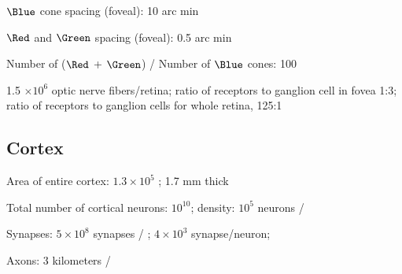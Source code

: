 \item $\Blue$ cone spacing (foveal): 10 arc min

\item $\Red$ and $\Green$ spacing (foveal): 0.5 arc min

\item Number of ($\Red$ + $\Green$) / Number of $\Blue$ cones: 100

\item 1.5 $\times 10^6$ optic nerve fibers/retina; ratio of receptors to
ganglion cell in fovea 1:3; ratio of receptors to ganglion cells for
whole retina, 125:1

\ee

\subsection*{Cortex}

\be

\item Area of entire cortex: $1.3 \times 10^5$ \squaremm; 1.7 mm thick 

\item Total number of cortical neurons: $10^{10}$;
density: $10^5$ neurons / \cubicmm

\item Synapses: $ 5 \times 10^ 8$ synapses / \cubicmm; 
$4 \times 10^3$ synapse/neuron; 

\item Axons: 3 kilometers /\cubicmm

